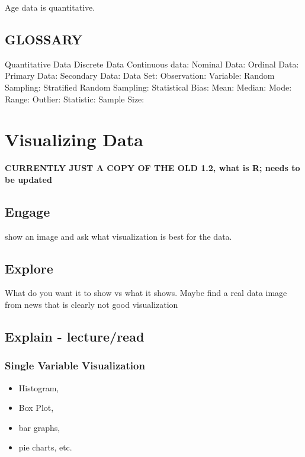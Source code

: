 \documentclass[
]{book}
\providecommand{\tightlist}{%
  \setlength{\itemsep}{0pt}\setlength{\parskip}{0pt}}
\begin{document}
Age data is quantitative.

\hypertarget{glossary}{%
\section{GLOSSARY}\label{glossary}}

Quantitative Data
Discrete Data
Continuous data:
Nominal Data:
Ordinal Data:
Primary Data:
Secondary Data:
Data Set:
Observation:
Variable:
Random Sampling:
Stratified Random Sampling:
Statistical Bias:
Mean:
Median:
Mode:
Range:
Outlier:
Statistic:
Sample Size:

\hypertarget{visualizing-data}{%
\chapter{Visualizing Data}\label{visualizing-data}}

\textbf{CURRENTLY JUST A COPY OF THE OLD 1.2, what is R; needs to be updated }

\hypertarget{engage-1}{%
\section{Engage}\label{engage-1}}

show an image and ask what visualization is best for the data.

\hypertarget{explore-1}{%
\section{Explore}\label{explore-1}}

What do you want it to show vs what it shows. Maybe find a real data image from news that is clearly not good visualization

\hypertarget{explain---lectureread}{%
\section{Explain - lecture/read}\label{explain---lectureread}}

\hypertarget{single-variable-visualization}{%
\subsection{Single Variable Visualization}\label{single-variable-visualization}}

\begin{itemize}
\tightlist
\item
  Histogram,
\item
  Box Plot,
\item
  bar graphs,
\item
  pie charts, etc.
\end{itemize}
\end{document}
